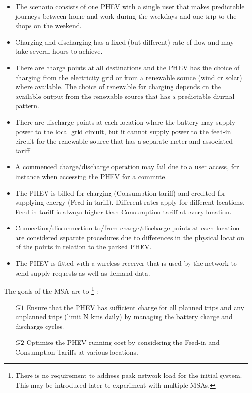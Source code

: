 \documentclass[a4paper]{article}
\begin{document}
\begin{itemize}

\item The scenario consists of one PHEV with a single user that makes predictable journeys between home and work during the weekdays and one trip to the shops on the weekend.

\item Charging and discharging has a fixed (but different) rate of flow and may take several hours to achieve.

\item There are charge points at all destinations and the PHEV has the choice of charging from the electricity grid or from a renewable source (wind or solar) where available. The choice of renewable for charging depends on the available output from the renewable source that has a predictable diurnal pattern.

\item There are discharge points at each location where the battery may supply power to the local grid circuit, but it cannot supply power to the feed-in circuit for the renewable source that has a separate meter and associated tariff.

\item A commenced charge/discharge operation may fail due to a user access, for instance when accessing the PHEV for a commute.

\item The PHEV is billed for charging (Consumption tariff) and credited for supplying energy (Feed-in tariff). Different rates apply for different locations. Feed-in tariff is always higher than Consumption tariff at every location.

\item Connection/disconnection to/from charge/discharge points at each location are considered separate procedures due to differences in the physical location of the points in relation to the parked PHEV.

\item The PHEV is fitted with a wireless receiver that is used by the network to send supply requests as well as demand data.



\end{itemize}

The goals of the MSA are to \footnote{There is no requirement to address peak network load for the initial system. This may be introduced later to experiment with multiple MSAs.}
:
\begin{enumerate}
\item[$G1$] Ensure that the PHEV has sufficient charge for all planned trips and any unplanned trips (limit N kms daily) by managing the battery charge and discharge cycles.
\item[$G2$] Optimise the PHEV running cost by considering the Feed-in and Consumption Tariffs at various locations.
\end{enumerate}
\end{document}
